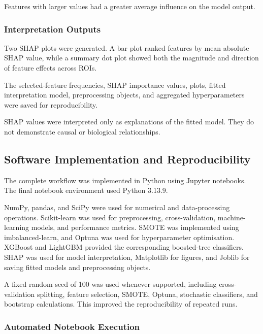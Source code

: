 \documentclass[12pt,twocolumn]{article}
\begin{document}
Features with larger values had a greater average influence on the model
output.

\subsubsection{Interpretation Outputs}
\label{subsubsec:interpretation_outputs}

Two SHAP plots were generated. A bar plot ranked features by mean
absolute SHAP value, while a summary dot plot showed both the magnitude
and direction of feature effects across ROIs.

The selected-feature frequencies, SHAP importance values, plots, fitted
interpretation model, preprocessing objects, and aggregated
hyperparameters were saved for reproducibility.

SHAP values were interpreted only as explanations of the fitted model.
They do not demonstrate causal or biological relationships.









\subsection{Software Implementation and Reproducibility}
\label{subsec:software_reproducibility}

The complete workflow was implemented in Python using Jupyter
notebooks. The final notebook environment used Python 3.13.9.

NumPy, pandas, and SciPy were used for numerical and data-processing
operations. Scikit-learn was used for preprocessing,
cross-validation, machine-learning models, and performance metrics.
SMOTE was implemented using imbalanced-learn, and Optuna was used for
hyperparameter optimisation. XGBoost and LightGBM provided the
corresponding boosted-tree classifiers. SHAP was used for model
interpretation, Matplotlib for figures, and Joblib for saving fitted
models and preprocessing objects.

A fixed random seed of 100 was used whenever supported, including
cross-validation splitting, feature selection, SMOTE, Optuna,
stochastic classifiers, and bootstrap calculations. This improved the
reproducibility of repeated runs.

\subsubsection{Automated Notebook Execution}
\label{subsubsec:parameterised_execution}
\end{document}
